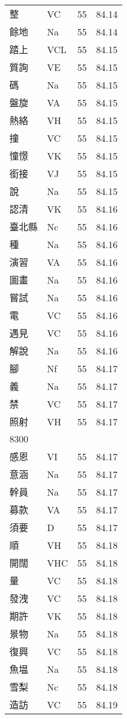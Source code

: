 \documentclass[twocolumn]{book}
\begin{document}
\begin{supertabular}{llrr}
整 & VC & 55 &  84.14\\
餘地 & Na & 55 &  84.14\\
踏上 & VCL & 55 &  84.15\\
質詢 & VE & 55 &  84.15\\
碼 & Na & 55 &  84.15\\
盤旋 & VA & 55 &  84.15\\
熱絡 & VH & 55 &  84.15\\
撞 & VC & 55 &  84.15\\
憧憬 & VK & 55 &  84.15\\
銜接 & VJ & 55 &  84.15\\
說 & Na & 55 &  84.15\\
認清 & VK & 55 &  84.16\\
臺北縣 & Nc & 55 &  84.16\\
種 & Na & 55 &  84.16\\
演習 & VA & 55 &  84.16\\
圖畫 & Na & 55 &  84.16\\
嘗試 & Na & 55 &  84.16\\
電 & VC & 55 &  84.16\\
遇見 & VC & 55 &  84.16\\
解說 & Na & 55 &  84.16\\
腳 & Nf & 55 &  84.17\\
義 & Na & 55 &  84.17\\
禁 & VC & 55 &  84.17\\
照射 & VH & 55 &  84.17\\
8300\\
感恩 & VI & 55 &  84.17\\
意涵 & Na & 55 &  84.17\\
幹員 & Na & 55 &  84.17\\
募款 & VA & 55 &  84.17\\
須要 & D & 55 &  84.17\\
順 & VH & 55 &  84.18\\
開闊 & VHC & 55 &  84.18\\
量 & VC & 55 &  84.18\\
發洩 & VC & 55 &  84.18\\
期許 & VK & 55 &  84.18\\
景物 & Na & 55 &  84.18\\
復興 & VC & 55 &  84.18\\
魚塭 & Na & 55 &  84.18\\
雪梨 & Nc & 55 &  84.18\\
造訪 & VC & 55 &  84.19\\

\end{supertabular}
\end{document}
